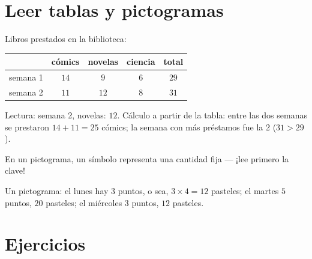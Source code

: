 \section{Leer tablas y pictogramas}

\begin{example}\label{ex:g3:problems:table}
Libros prestados en la biblioteca:
\begin{center}
\renewcommand{\arraystretch}{1.3}
\begin{tabular}{l|cccc}
 & cómics & novelas & ciencia & total \\
\hline
semana 1 & $14$ & $9$ & $6$ & $29$ \\
semana 2 & $11$ & $12$ & $8$ & $31$ \\
\end{tabular}
\end{center}
Lectura: semana 2, novelas: $12$. Cálculo a partir de la tabla: entre las dos
semanas se prestaron $14 + 11 = 25$ cómics; la semana con más préstamos
fue la 2 ($31 > 29$).
\end{example}

\begin{example}[Un pictograma]\label{ex:g3:problems:pictogram}
En un pictograma, un símbolo representa una cantidad fija --- ¡lee
primero la clave!

\begin{omfigure}

{\small Un pictograma: el lunes hay $3$ puntos, o sea, $3 \times 4 = 12$
pasteles; el martes $5$ puntos, $20$ pasteles; el miércoles $3$ puntos, $12$
pasteles.}
\end{omfigure}
\end{example}

\section{Ejercicios}

